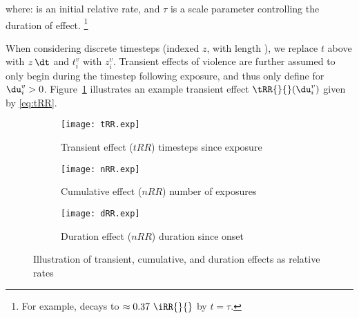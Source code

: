 where:
\iRR{}{} is an initial relative rate, and
$\tau$ is a scale parameter controlling the duration of effect.%
\footnote{For example, \tRR{}{} decays to $\approx 0.37~\iRR{}{}$ by $t = \tau$.}
\par
When considering discrete timesteps (indexed $z$, with length \dt),
we replace $t$ above with $z\,\dt$ and $t^v_i$ with $z^v_i$.
Transient effects of violence are further assumed to
only begin during the timestep following exposure,
and thus only define \tRR{}{} for $\du^v_i > 0$.
Figure~\ref{fig:tRR} illustrates
an example transient effect $\tRR{}{}(\du^v_i)$ given by \eqref{eq:tRR}.
\begin{figure}
  \centering
  \begin{subfigure}{.5\linewidth}
    \texttt{[image: tRR.exp]}
    \caption{Transient effect ($tRR$) \vs timesteps since exposure}
    \label{fig:tRR}
  \end{subfigure}%
  \begin{subfigure}{.5\linewidth}
    \texttt{[image: nRR.exp]}
    \caption{Cumulative effect ($nRR$) \vs number of exposures}
    \label{fig:nRR}
  \end{subfigure}
  \begin{subfigure}{.5\linewidth}
    \texttt{[image: dRR.exp]}
    \caption{Duration effect ($nRR$) \vs duration since onset}
    \label{fig:dRR}
  \end{subfigure}
  \caption{Illustration of transient, cumulative, and duration effects as relative rates}
  \label{fig:xRR}
\end{figure}
